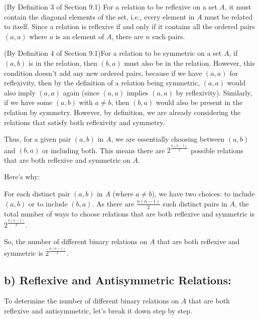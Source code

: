 \documentclass[12pt]{article}
\begin{document}
(By Definition 3 of Section 9.1) For a relation to be reflexive on a set \( A \), it must contain the diagonal elements of the set, i.e., every element in \( A \) must be related to itself. Since a relation is reflexive if and only if it contains all the ordered pairs \( (a,a) \) where \( a \) is an element of \( A \), there are \( n \) such pairs.

(By Definition 4 of Section 9.1)For a relation to be symmetric on a set \( A \), if \( (a,b) \) is in the relation, then \( (b,a) \) must also be in the relation. However, this condition doesn't add any new ordered pairs, because if we have \( (a,a) \) for reflexivity, then by the definition of a relation being symmetric, \( (a,a) \) would also imply \( (a,a) \) again (since \( (a,a) \) implies \( (a,a) \) by reflexivity). Similarly, if we have some \( (a,b) \) with \( a \neq b \), then \( (b,a) \) would also be present in the relation by symmetry. However, by definition, we are already considering the relations that satisfy both reflexivity and symmetry.

Thus, for a given pair \( (a,b) \) in \( A \), we are essentially choosing between \( (a,b) \) and \( (b,a) \) or including both. This means there are \( 2^{\frac{n(n-1)}{2}} \) possible relations that are both reflexive and symmetric on \( A \).

Here's why:

For each distinct pair \( (a,b) \) in \( A \) (where \( a \neq b \)), we have two choices: to include \( (a,b) \) or to include \( (b,a) \). As there are \( \frac{n(n-1)}{2} \) such distinct pairs in \( A \), the total number of ways to choose relations that are both reflexive and symmetric is \( 2^{\frac{n(n-1)}{2}} \).

So, the number of different binary relations on \( A \) that are both reflexive and symmetric is \( 2^{\frac{n(n-1)}{2}} \).


\subsection*{b) Reflexive and Antisymmetric Relations:}

To determine the number of different binary relations on \( A \) that are both reflexive and antisymmetric, let's break it down step by step.
\end{document}
